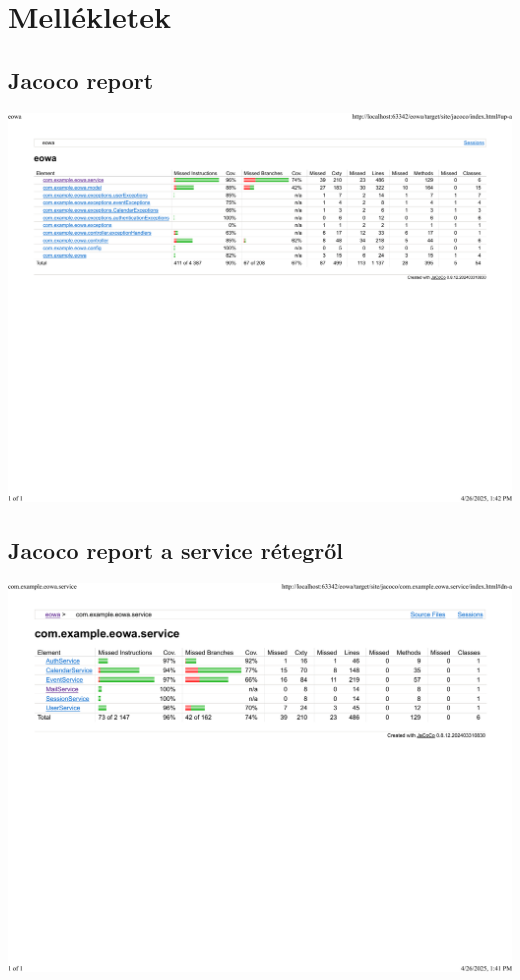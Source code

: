 \documentclass[a4paper,12pt]{report}
\theoremstyle{definition}
\theoremstyle{remark}
\begin{document}
\newpage
\section*{Mellékletek}

\subsection{Jacoco report}
\label{jacoco}
\begin{center}
\includegraphics[width=170mm]{jacoco.pdf}

\end{center}

\subsection{Jacoco report a service rétegről}
\label{jacocoservice}
\begin{center}
\includegraphics[width=170mm]{jacoco_service.pdf}

\end{center}






\vspace{2 cm}
\end{document}
